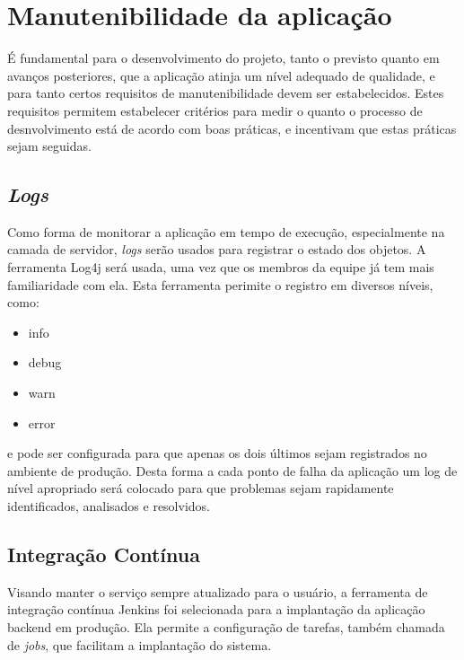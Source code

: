 \section{Manutenibilidade da aplicação}

É fundamental para o desenvolvimento do projeto, tanto o previsto
quanto em avanços posteriores, que a aplicação atinja um nível adequado
de qualidade, e para tanto certos requisitos de manutenibilidade devem
ser estabelecidos.  Estes requisitos permitem estabelecer critérios
para medir o quanto o processo de desnvolvimento está de acordo com
boas práticas, e incentivam que estas práticas sejam seguidas.

\subsection{\emph{Logs}}

Como forma de monitorar a aplicação em tempo de execução,
especialmente na camada de servidor, \emph{logs} serão usados para
registrar o estado dos objetos. A ferramenta Log4j será usada, uma vez
que os membros da equipe já tem mais familiaridade com ela. Esta
ferramenta perimite o registro em diversos níveis, como:
\begin{itemize}
  \em
\item info
\item debug
\item warn
\item error
\end{itemize}
e pode ser configurada para que apenas os dois últimos
sejam registrados no ambiente de produção. Desta forma a cada ponto de
falha da aplicação um log de nível apropriado será colocado para que
problemas sejam rapidamente identificados, analisados e resolvidos.

\subsection{Integração Contínua}

Visando manter o serviço sempre atualizado para o usuário, a
ferramenta de integração contínua Jenkins foi selecionada para a
implantação da aplicação \gls{backend} em produção. Ela permite a
configuração de tarefas, também chamada de \emph{jobs}, que facilitam
a implantação do sistema.

